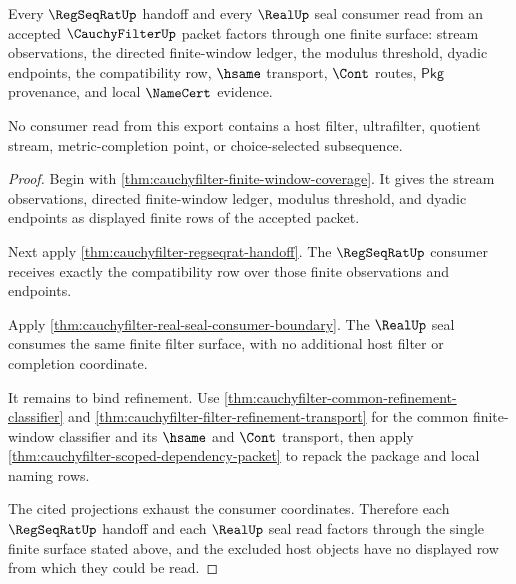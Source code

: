 \begin{theorem}
\label{thm:cauchyfilter-regseqrat-real-seal-exhaustion}
Every $\RegSeqRatUp$ handoff and every $\RealUp$ seal consumer read from an
accepted $\CauchyFilterUp$ packet factors through one finite surface: stream
observations, the directed finite-window ledger, the modulus threshold,
dyadic endpoints, the compatibility row, $\hsame$ transport, $\Cont$ routes,
$\mathsf{Pkg}$ provenance, and local $\NameCert$ evidence.

No consumer read from this export contains a host filter, ultrafilter,
quotient stream, metric-completion point, or choice-selected subsequence.
\end{theorem}
\begin{proof}
Begin with \autoref{thm:cauchyfilter-finite-window-coverage}. It gives the
stream observations, directed finite-window ledger, modulus threshold, and
dyadic endpoints as displayed finite rows of the accepted packet.

Next apply \autoref{thm:cauchyfilter-regseqrat-handoff}. The
$\RegSeqRatUp$ consumer receives exactly the compatibility row over those
finite observations and endpoints.

Apply \autoref{thm:cauchyfilter-real-seal-consumer-boundary}. The $\RealUp$
seal consumes the same finite filter surface, with no additional host filter
or completion coordinate.

It remains to bind refinement. Use
\autoref{thm:cauchyfilter-common-refinement-classifier} and
\autoref{thm:cauchyfilter-filter-refinement-transport} for the common
finite-window classifier and its $\hsame$ and $\Cont$ transport, then apply
\autoref{thm:cauchyfilter-scoped-dependency-packet} to repack the package and
local naming rows.

The cited projections exhaust the consumer coordinates. Therefore each
$\RegSeqRatUp$ handoff and each $\RealUp$ seal read factors through the single
finite surface stated above, and the excluded host objects have no displayed
row from which they could be read.
\end{proof}

